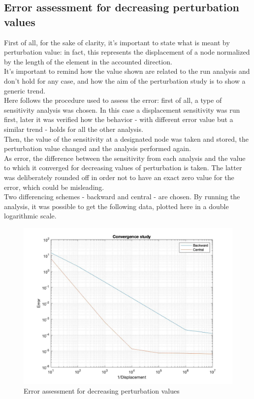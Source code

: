 \subsection{Error assessment for decreasing perturbation values}
First of all, for the sake of clarity, it's important to state what is meant by perturbation value: in fact, this represents the displacement of a node normalized by the length of the element in the accounted direction.\\[6pt]
It's important to remind how the value shown are related to the run analysis and don't hold for any case, and how the aim of the perturbation study is to show a generic trend. \\[6pt]
Here follows the procedure used to assess the error: first of all, a type of sensitivity analysis was chosen. In this case a displacement sensitivity was run first, later it was verified how the behavior - with different error value but a similar trend - holds for all the other analysis. \\[6pt]
Then, the value of the sensitivity at a designated node was taken and stored, the perturbation value changed and the analysis performed again. \\[6pt]
As error, the difference between the sensitivity from each analysis and the value to which it converged for decreasing values of perturbation is taken. The latter was deliberately rounded off in order not to have an exact zero value for the error, which could be misleading.\\[6pt]
Two differencing schemes - backward and central - are chosen.
By running the analysis, it was possible to get the following data, plotted here in a double logarithmic scale.
\begin{figure}[h]
\centering
  \includegraphics[width=140mm]{images/perturbation.jpg}
  \caption{Error assessment for decreasing perturbation values}
\end{figure}
